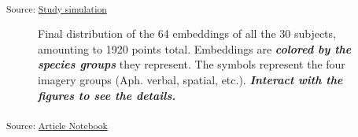 \documentclass[
  authoryear]{elsarticle}
\begin{document}
\textsubscript{Source:
\href{https://m-delem.github.io/2499-similarity-manuscript/notebooks/simulation-code-preview.html\#cell-subject-embeddings}{Study
simulation}}

\label{cell-fig-subject-embeddings-a}
\begin{figure}[H]


\caption{\label{fig-subject-embeddings-a}Final distribution of the 64
embeddings of all the 30 subjects, amounting to 1920 points total.
Embeddings are \textbf{\emph{colored by the species groups}} they
represent. The symbols represent the four imagery groups (Aph. verbal,
spatial, etc.). \textbf{\emph{Interact with the figures to see the
details.}}}

\end{figure}%

\textsubscript{Source:
\href{https://m-delem.github.io/2499-similarity-manuscript/index.qmd.html}{Article
Notebook}}
\end{document}
